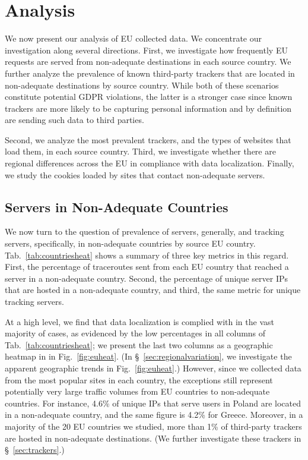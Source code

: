 

\section{Analysis}
We now present our analysis of 
EU collected data. We concentrate our investigation 
along several directions. First, we investigate how frequently EU
requests are served from non-adequate destinations in each
source country.
We further analyze the prevalence of known third-party trackers
that are located in non-adequate destinations by source country.
While both of these scenarios constitute potential GDPR violations,
the latter is a stronger case since known trackers are more 
likely to be capturing personal information and 
by definition are sending such data to 
third parties.

Second, we analyze the most prevalent trackers, and the types of
websites that load them, in each source country.
Third, we investigate whether there are regional differences
across the EU in compliance with data localization.
Finally, we study the cookies loaded by sites that contact
non-adequate servers.


\subsection{Servers in Non-Adequate Countries}
\label{sec:analysis1}

We now turn to the question of prevalence of servers, generally,
and tracking servers, specifically, in non-adequate countries
by source EU country. 
Tab.~\ref{tab:countriesheat} shows a
summary of three key metrics in this regard. First, the
percentage of traceroutes sent from each EU country that reached
a server in a non-adequate country. Second, the percentage
of unique server IPs that are hosted in a non-adequate country,
and third, the same metric for unique tracking servers.

At a high level, we find that data localization is complied with
in the vast majority of cases, as evidenced by the low
percentages in all columns of Tab.~\ref{tab:countriesheat};
we present the last two columns as a geographic heatmap in  
in Fig.~\ref{fig:euheat}.
(In \S~\ref{sec:regionalvariation}, we investigate the 
apparent geographic trends in Fig.~\ref{fig:euheat}.)
However, since
we collected data from the most popular sites in each country,
the exceptions still represent potentially very large traffic volumes
from EU countries to non-adequate countries. For instance,
4.6\% of unique IPs that serve users in Poland are located
in a non-adequate country, and the same figure is 4.2\% for Greece.
Moreover, in a majority of the 20 EU countries we studied,
more than 1\% of third-party trackers are hosted 
in non-adequate destinations. (We further investigate 
these trackers in \S~\ref{sec:trackers}.)



